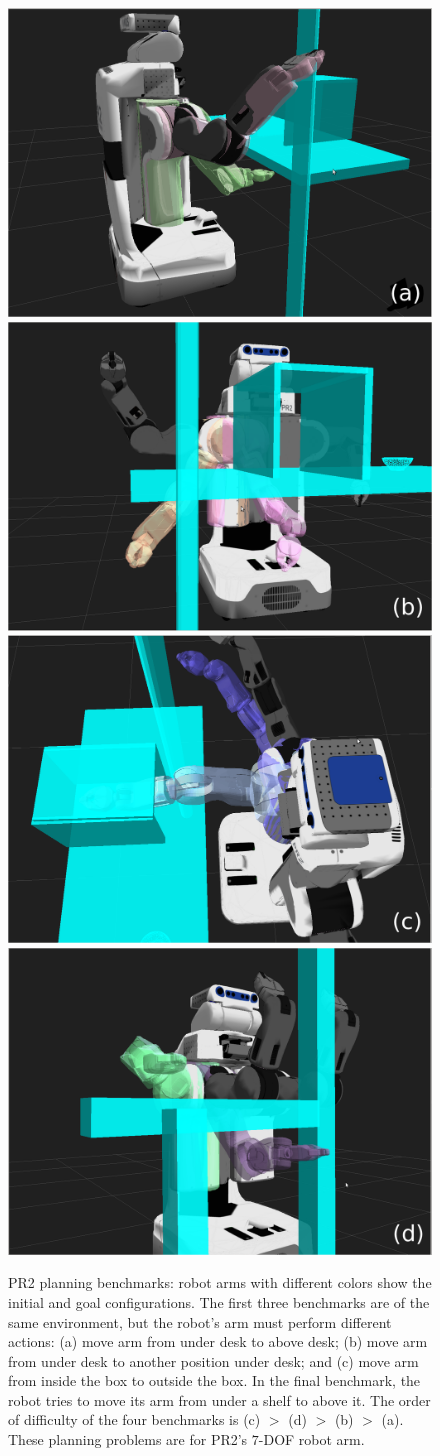 \begin{figure}[!h]
  \centering
  \includegraphics[width=0.24\linewidth]{figs/3/benchmark1.png}
  \includegraphics[width=0.24\linewidth]{figs/3/benchmark2.png}
  \includegraphics[width=0.24\linewidth]{figs/3/benchmark3.png}
  \includegraphics[width=0.24\linewidth]{figs/3/benchmark4.png}
  \caption[PR2 planning benchmarks for instance-based learning]{\label{fig:3:benchmark} PR2 planning benchmarks: robot arms with different colors show the initial and goal configurations. The first three benchmarks are of the same environment, but the robot's arm must perform different actions: (a) move arm from under desk to above desk; (b) move arm from under desk to another position under desk; and (c) move arm from inside the box to outside the box. In the final benchmark, the robot tries to move its arm from under a shelf to above it. The order of difficulty of the four benchmarks is (c) $>$ (d) $>$ (b) $>$ (a). These planning problems are for PR2's $7$-DOF robot arm.}
\end{figure}

